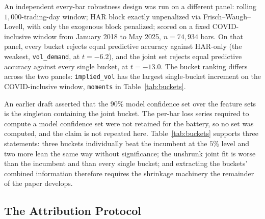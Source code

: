 An independent every-bar robustness design was run on a different panel:
rolling $1{,}000$-trading-day window; HAR block exactly unpenalized via
Frisch--Waugh--Lovell, with only the exogenous block penalized; scored on a
fixed COVID-inclusive window from January 2018 to May 2025, $n = 74{,}934$
bars. On that panel, every bucket rejects equal predictive accuracy against
HAR-only (the weakest, \texttt{vol\_demand}, at $t = -6.2$), and the joint
set rejects equal predictive accuracy against every single bucket, at
$t = -13.0$. The bucket ranking differs across the two panels:
\texttt{implied\_vol} has the largest single-bucket increment on the
COVID-inclusive window, \texttt{moments} in Table~\ref{tab:buckets}.

An earlier draft asserted that the $90\%$ model confidence set
\citep{HansenLundeNason2011} over the feature sets is the singleton
containing the joint bucket. The per-bar loss series required to compute a
model confidence set were not retained for the battery, so no set was
computed, and the claim is not repeated here.
Table~\ref{tab:buckets} supports three statements: three buckets
individually beat the incumbent at the $5\%$ level and two more lean the
same way without significance; the unshrunk joint fit is worse than the
incumbent and than every single bucket; and extracting the buckets'
combined information therefore requires the shrinkage machinery the
remainder of the paper develops.



\subsection{The Attribution Protocol}
\label{sec:attribution}

